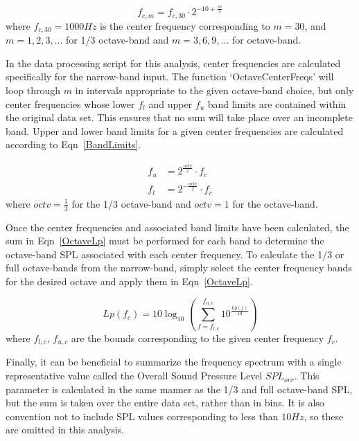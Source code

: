 \documentclass[twocolumn,10pt]{asme2ej}
\begin{document}
\begin{equation} \label{CenterFreqs}
f_{c,m} = f_{c,30}\cdot 2^{-10 + \frac{m}{3}}
\end{equation}
\noindent where $f_{c,30}=1000Hz$ is the center frequency corresponding to $m=30$, and $m=1,2,3,...$ for 1/3 octave-band and $m=3,6,9,...$ for octave-band.

In the data processing script for this analysis, center frequencies are calculated specifically for the narrow-band input.  The function `OctaveCenterFreqs' will loop through $m$ in intervals appropriate to the given octave-band choice, but only center frequencies whose lower $f_l$ and upper $f_u$ band limits are contained within the original data set.  This ensures that no sum will take place over an incomplete band.  Upper and lower band limits for a given center frequencies are calculated according to Eqn~\ref{BandLimits}.

\begin{equation} \label{BandLimits}
\begin{split}
f_u &= 2^{\frac{octv}{2}} \cdot f_c \\
f_l &= 2^{-\frac{octv}{2}} \cdot f_c
\end{split}
\end{equation}
\noindent where $octv=\frac{1}{3}$ for the 1/3 octave-band and $octv=1$ for the octave-band.

Once the center frequencies and associated band limits have been calculated, the sum in Eqn~\ref{OctaveLp} must be performed for each band to determine the octave-band SPL associated with each center frequency.  To calculate the 1/3 or full octave-bands from the narrow-band, simply select the center frequency bands for the desired octave and apply them in Eqn~\ref{OctaveLp}.

\begin{equation} \label{OctaveLp}
Lp(f_c) = 10\log_{10}\left( \sum_{f=f_{l,c}}^{f_{u,c}} 10^{\frac{Lp(f)}{10}} \right)
\end{equation}
\noindent where $f_{l,c},\,f_{u,c}$ are the bounds corresponding to the given center frequency $f_c$.

Finally, it can be beneficial to summarize the frequency spectrum with a single representative value called the Overall Sound Pressure Level $SPL_{ovr}$.  This parameter is calculated in the same manner as the 1/3 and full octave-band SPL, but the sum is taken over the entire data set, rather than in bins.  It is also convention not to include SPL values corresponding to less than $10Hz$, so these are omitted in this analysis.
\end{document}
